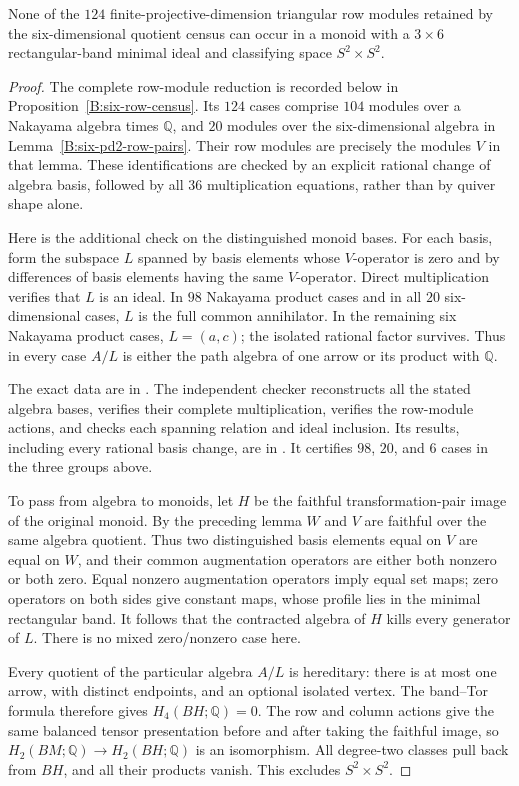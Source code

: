 \begin{proposition}\label{B:six-pd2-actual-bases}
None of the $124$ finite-projective-dimension triangular row
modules retained by the six-dimensional quotient census can
occur in a monoid with a $3\times6$ rectangular-band minimal
ideal and classifying space $S^2\times S^2$.
\end{proposition}
\begin{proof}
The complete row-module reduction is recorded below in
Proposition~\ref{B:six-row-census}.  Its $124$ cases comprise
$104$ modules over a Nakayama algebra times $\mathbb Q$, and
$20$ modules over the six-dimensional algebra in
Lemma~\ref{B:six-pd2-row-pairs}.  Their row modules are precisely
the modules $V$ in that lemma.  These identifications are checked
by an explicit rational change of algebra basis, followed by all
$36$ multiplication equations, rather than by quiver shape alone.

Here is the additional check on the distinguished monoid bases.
For each basis, form the subspace $L$ spanned by basis elements
whose $V$-operator is zero and by differences of basis elements
having the same $V$-operator.  Direct multiplication verifies
that $L$ is an ideal.  In $98$ Nakayama product cases and in all
$20$ six-dimensional cases, $L$ is the full common annihilator.
In the remaining six Nakayama product cases, $L=(a,c)$; the
isolated rational factor survives.  Thus in every case $A/L$ is
either the path algebra of one arrow or its product with
$\mathbb Q$.

The exact data are in
.
The independent checker
 reconstructs all the stated
algebra bases, verifies their complete multiplication, verifies
the row-module actions, and checks each spanning relation and
ideal inclusion.  Its results, including every rational basis
change, are in
.
It certifies $98$, $20$, and $6$ cases in the three groups above.

To pass from algebra to monoids, let $H$ be the faithful
transformation-pair image of the original monoid.  By the preceding
lemma $W$ and $V$ are faithful over the same algebra quotient.
Thus two distinguished basis elements equal on $V$ are equal on
$W$, and their common augmentation operators are either both
nonzero or both zero.  Equal nonzero augmentation operators imply
equal set maps; zero operators on both sides give constant maps,
whose profile lies in the minimal rectangular band.  It follows
that the contracted algebra of $H$ kills every generator of $L$.
There is no mixed zero/nonzero case here.

Every quotient of the particular algebra $A/L$ is hereditary:
there is at most one arrow, with distinct endpoints, and an
optional isolated vertex.  The band--Tor formula therefore gives
$H_4(BH;\mathbb Q)=0$.  The row and column actions give the same
balanced tensor presentation before and after taking the faithful
image, so $H_2(BM;\mathbb Q)\to H_2(BH;\mathbb Q)$ is an
isomorphism.  All degree-two classes pull back from $BH$, and
all their products vanish.  This excludes $S^2\times S^2$.
\end{proof}
